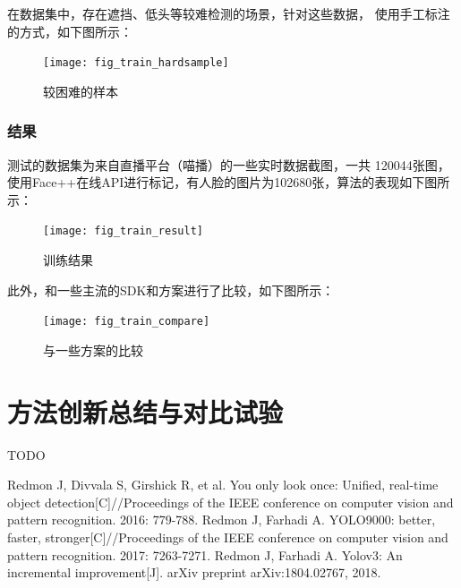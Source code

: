 \documentclass[a4paper, notitlepage]{article}
\begin{document}
在数据集中，存在遮挡、低头等较难检测的场景，针对这些数据，
使用手工标注的方式，如下图所示：

\begin{figure}[H]
    \centering
    \texttt{[image: fig\_train\_hardsample]}
    \caption{较困难的样本}
    \label{fig:example}
\end{figure}

\subsubsection{结果}
测试的数据集为来自直播平台（喵播）的一些实时数据截图，一共
120044张图，使用Face++在线API进行标记，有人脸的图片为102680张，算法的表现如下图所示：
\begin{figure}[H]
    \centering
    \texttt{[image: fig\_train\_result]}
    \caption{训练结果}
    \label{fig:example}
\end{figure}

此外，和一些主流的SDK和方案进行了比较，如下图所示：

\begin{figure}[H]
    \centering
    \texttt{[image: fig\_train\_compare]}
    \caption{与一些方案的比较}
    \label{fig:example}
\end{figure}

\section{方法创新总结与对比试验}
TODO

\begin{thebibliography}{X}
Redmon J, Divvala S, Girshick R, et al. You only look once: Unified, real-time object detection[C]//Proceedings of the IEEE conference on computer vision and pattern recognition. 2016: 779-788.
Redmon J, Farhadi A. YOLO9000: better, faster, stronger[C]//Proceedings of the IEEE conference on computer vision and pattern recognition. 2017: 7263-7271. 
Redmon J, Farhadi A. Yolov3: An incremental improvement[J]. arXiv preprint arXiv:1804.02767, 2018.
\end{thebibliography}

\clearpage


\end{document}
